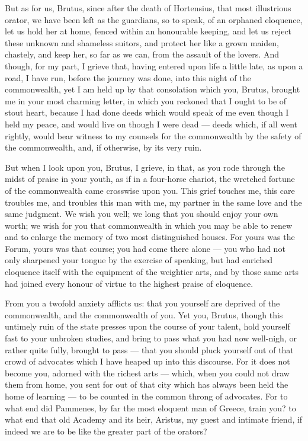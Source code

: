  But as for us, Brutus, since after the death of Hortensius, that most illustrious orator, we have been left as the guardians, so to speak, of an orphaned eloquence, let us hold her at home, fenced within an honourable keeping, and let us reject these unknown and shameless suitors, and protect her like a grown maiden, chastely, and keep her, so far as we can, from the assault of the lovers. And though, for my part, I grieve that, having entered upon life a little late, as upon a road, I have run, before the journey was done, into this night of the commonwealth, yet I am held up by that consolation which you, Brutus, brought me in your most charming letter, in which you reckoned that I ought to be of stout heart, because I had done deeds which would speak of me even though I held my peace, and would live on though I were dead — deeds which, if all went rightly, would bear witness to my counsels for the commonwealth by the safety of the commonwealth, and, if otherwise, by its very ruin.

 But when I look upon you, Brutus, I grieve, in that, as you rode through the midst of praise in your youth, as if in a four-horse chariot, the wretched fortune of the commonwealth came crosswise upon you. This grief touches me, this care troubles me, and troubles this man with me, my partner in the same love and the same judgment. We wish you well; we long that you should enjoy your own worth; we wish for you that commonwealth in which you may be able to renew and to enlarge the memory of two most distinguished houses. For yours was the Forum, yours was that course; you had come there alone — you who had not only sharpened your tongue by the exercise of speaking, but had enriched eloquence itself with the equipment of the weightier arts, and by those same arts had joined every honour of virtue to the highest praise of eloquence.

 From you a twofold anxiety afflicts us: that you yourself are deprived of the commonwealth, and the commonwealth of you. Yet you, Brutus, though this untimely ruin of the state presses upon the course of your talent, hold yourself fast to your unbroken studies, and bring to pass what you had now well-nigh, or rather quite fully, brought to pass — that you should pluck yourself out of that crowd of advocates which I have heaped up into this discourse. For it does not become you, adorned with the richest arts — which, when you could not draw them from home, you sent for out of that city which has always been held the home of learning — to be counted in the common throng of advocates. For to what end did Pammenes, by far the most eloquent man of Greece, train you? to what end that old Academy and its heir, Aristus, my guest and intimate friend, if indeed we are to be like the greater part of the orators?

